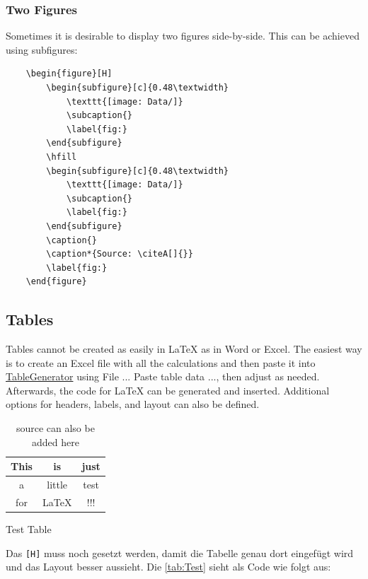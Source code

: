 \subsubsection{Two Figures}

Sometimes it is desirable to display two figures side-by-side. This can be achieved using subfigures:

\begin{verbatim}
    \begin{figure}[H]
        \begin{subfigure}[c]{0.48\textwidth}
            \texttt{[image: Data/]}
            \subcaption{}
            \label{fig:}
        \end{subfigure}
        \hfill
        \begin{subfigure}[c]{0.48\textwidth}
            \texttt{[image: Data/]}
            \subcaption{}
            \label{fig:}
        \end{subfigure}
        \caption{}
        \caption*{Source: \citeA[]{}}
        \label{fig:}
    \end{figure}
\end{verbatim}


\subsection{Tables}

Tables cannot be created as easily in \LaTeX{} as in Word or Excel. The easiest way is to create an Excel file with all the calculations and then paste it into \href{https://www.tablesgenerator.com/latex_tables}{TableGenerator} using File ... Paste table data ..., then adjust as needed. Afterwards, the code for \LaTeX{} can be generated and inserted. Additional options for headers, labels, and layout can also be defined.

\begin{table}[H]
    \centering
    \begin{tabular}{|c|c|c|}
        \hline
        This    & is        & just  \\ \hline
        a       & little    & test  \\ \hline
        for     & \LaTeX{}  & !!!   \\ \hline
    \end{tabular}
    \caption{Test Table} \label{tab:Test}
    \caption*{source can also be added here}
\end{table}

Das \verb|[H]| muss noch gesetzt werden, damit die Tabelle genau dort eingefügt wird und das Layout besser aussieht. Die \autoref{tab:Test} sieht als Code wie folgt aus:

